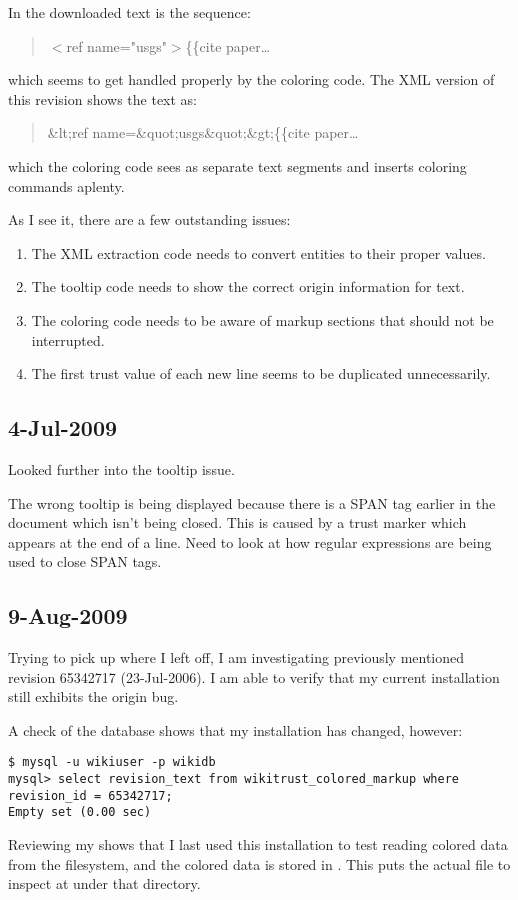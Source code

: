 In the downloaded text is the sequence:
\begin{quote}
$<$ref name="usgs"$>$\{\{cite paper\ldots
\end{quote}
which seems to get handled properly by the coloring code.
The XML version of this revision shows the text as:
\begin{quote}
\&lt;ref name=\&quot;usgs\&quot;\&gt;\{\{cite paper\ldots
\end{quote}
which the coloring code sees as separate text segments
and inserts coloring commands aplenty.


As I see it, there are a few outstanding issues:
\begin{enumerate}
\item The XML extraction code needs to convert entities to their
    proper values.
\item The tooltip code needs to show the correct origin information
    for text.
\item The coloring code needs to be aware of markup sections
    that should not be interrupted.
\item The first trust value of each new line seems to be
    duplicated unnecessarily.
\end{enumerate}

\subsection{4-Jul-2009}

Looked further into the tooltip issue.

The wrong tooltip is being displayed because there is a SPAN tag
earlier in the document which isn't being closed.
This is caused by a trust marker which appears at the end of a line.
Need to look at how regular expressions are being used to close SPAN tags.

\subsection{9-Aug-2009}

Trying to pick up where I left off, I am investigating
previously mentioned revision 65342717 (23-Jul-2006).
I am able to verify that my current installation still
exhibits the origin bug.

A check of the database shows that my installation has
changed, however:
\begin{verbatim}
$ mysql -u wikiuser -p wikidb
mysql> select revision_text from wikitrust_colored_markup where revision_id = 65342717;
Empty set (0.00 sec)
\end{verbatim}
Reviewing my  shows that I last used
this installation to test reading colored data from the filesystem,
and the colored data is stored in
.
This puts the actual file to inspect at
under that directory.

